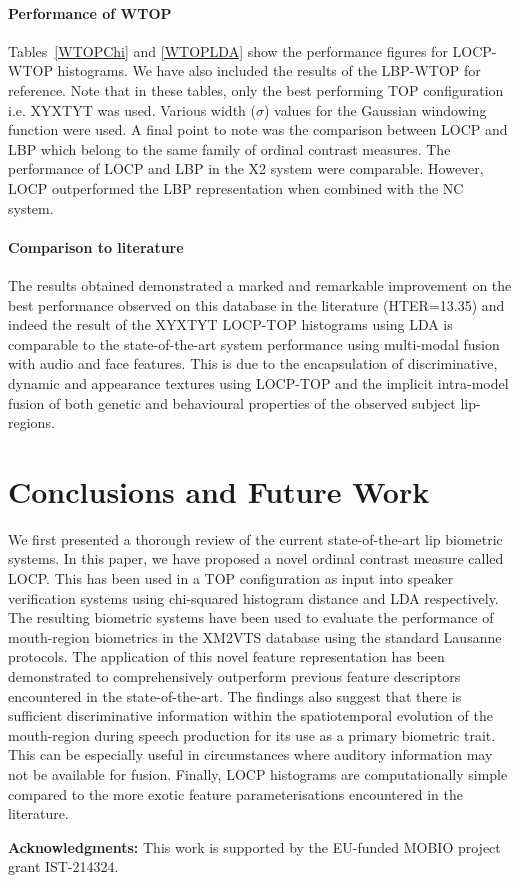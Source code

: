 \documentclass[a4paper, 10pt, conference]{ieeeconf}      %
\begin{document}
\paragraph*{Performance of WTOP}


Tables~\ref{WTOPChi} and \ref{WTOPLDA} show the performance figures for LOCP-WTOP histograms. 
We have also included the results of the LBP-WTOP for reference. 
Note that in these tables, only the best performing TOP configuration i.e. XYXTYT was used.
Various width ($\sigma$) values for the Gaussian windowing function were used. 
A final point to note was the comparison between LOCP and LBP which belong to the same family of ordinal contrast measures. 
The performance of LOCP and LBP in the X2 system were comparable.
However, LOCP outperformed the LBP representation when combined with the NC system.
\paragraph*{Comparison to literature}
The results obtained demonstrated a marked and remarkable improvement on the best performance observed on this database in the literature (HTER=13.35) and indeed the result of the XYXTYT LOCP-TOP histograms using LDA is comparable to the state-of-the-art system performance using multi-modal fusion with audio and face features. 
This is due to the encapsulation of discriminative, dynamic and appearance textures using LOCP-TOP and the implicit intra-model fusion of both genetic and behavioural properties of the observed subject lip-regions. 

\section{Conclusions and Future Work}
\label{Conclusions}
We first presented a thorough review of the current state-of-the-art lip biometric systems. In this paper, we have proposed a novel ordinal contrast measure called LOCP. This has been used in a TOP configuration as input into speaker verification systems using chi-squared histogram distance and LDA respectively. The resulting biometric systems have been used to evaluate the performance of mouth-region biometrics in the XM2VTS database using the standard Lausanne protocols. The application of this novel feature representation has been demonstrated to comprehensively outperform previous feature descriptors encountered in the state-of-the-art. The findings also suggest that there is sufficient discriminative information within the spatiotemporal evolution of the mouth-region during speech production for its use as a primary biometric trait. This can be especially useful in circumstances where auditory information may not be available for fusion. Finally, LOCP histograms are computationally simple compared to the more exotic feature parameterisations encountered in the literature.

\noindent\small{{\bf{Acknowledgments}:} This work is supported by the EU-funded MOBIO project grant IST-214324.}
 

\end{document}
